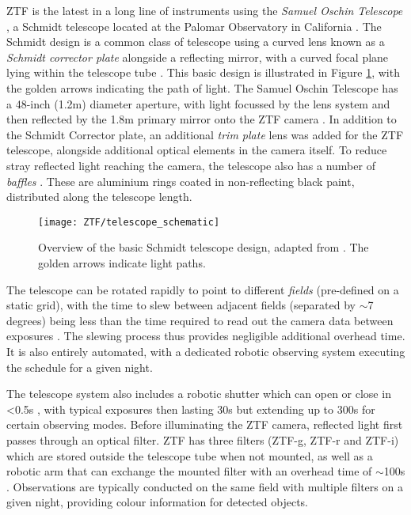 ZTF is the latest in a long line of instruments using the \emph{Samuel Oschin Telescope} \cite{ztf_system}, a Schmidt telescope located at the Palomar Observatory in California  . The Schmidt design is a common class of telescope using a curved lens known as a \emph{Schmidt corrector plate} alongside a reflecting mirror, with a curved focal plane lying within the telescope tube . This basic design is illustrated in Figure \ref{fig:ztf_schematic}, with the golden arrows indicating the path of light. The Samuel Oschin Telescope has a 48-inch (1.2m) diameter aperture, with light focussed by the lens system and then reflected by the 1.8m primary mirror onto the ZTF camera . In addition to the Schmidt Corrector plate, an additional \emph{trim plate} lens was added for the ZTF telescope, alongside additional optical elements in the camera itself. To reduce stray reflected light reaching the camera, the telescope also has a number of \emph{baffles} \cite{ztf_obs_system}. These are aluminium rings coated in non-reflecting black paint, distributed along the telescope length. 

\begin{figure}[!ht]
	\centering \texttt{[image: ZTF/telescope\_schematic]}
	\caption{Overview of the basic Schmidt telescope design, adapted from \cite{quest_07}. The golden arrows indicate light paths.}
	\label{fig:ztf_schematic}
\end{figure}

The telescope can be rotated rapidly to point to different \emph{fields} (pre-defined on a static grid), with the time to slew between adjacent fields (separated by $\sim$7 degrees) being less than the time required to read out the camera data between exposures \cite{ztf_system}. The slewing process thus provides negligible additional overhead time. It is also entirely automated, with a dedicated robotic observing system executing the schedule for a given night. 

The telescope system also includes a robotic shutter which can open or close in <0.5s \cite{ztf_system}, with typical exposures then lasting 30s but extending up to 300s for certain observing modes. Before illuminating the ZTF camera, reflected light first passes through an optical filter. ZTF has three filters (ZTF-g, ZTF-r and ZTF-i) which are stored outside the telescope tube when not mounted, as well as a robotic arm that can exchange the mounted filter with an overhead time of $\sim$100s \cite{ztf_system}. Observations are typically conducted on the same field with multiple filters on a given night, providing colour information for detected objects.

